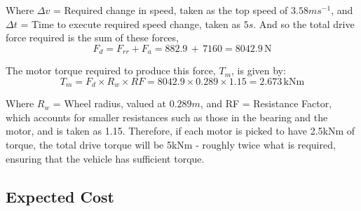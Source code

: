 \documentclass[12pt]{article}
\begin{document}
Where $\Delta v$ = Required change in speed, taken as the top speed of $3.58ms^{-1}$, and $\Delta t$ = Time to execute required speed change, taken as $5s$. And so the total drive force required is the sum of these forces,
\vspace{-5pt}
\begin{equation}
    F_d = F_{rr} + F_a = 882.9 \, + \, 7160 = 8042.9 \, \text{N}
\end{equation}
\vspace{-40pt}

The motor torque required to produce this force, $T_m$, is given by:
\vspace{-20pt}
\begin{equation}
    T_m = F_d \times R_w \times RF = 8042.9 \times 0.289 \times 1.15 = 2.673 \, \text{kNm}
\end{equation}
\vspace{-40pt}

Where $R_w$ = Wheel radius, valued at $0.289m$, and RF = Resistance Factor, which accounts for smaller resistances such as those in the bearing and the motor, and is taken as 1.15. Therefore, if each motor is picked to have 2.5kNm of torque, the total drive torque will be 5kNm - roughly twice what is required, ensuring that the vehicle has sufficient torque.

\subsection{Expected Cost}
\end{document}
